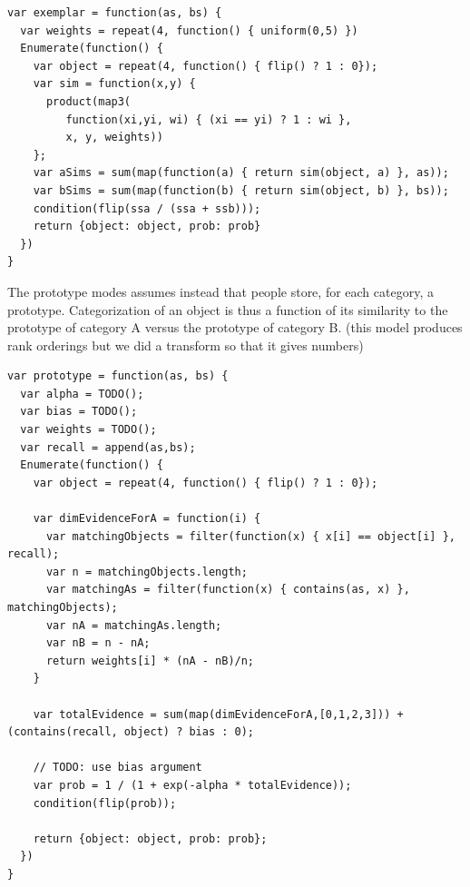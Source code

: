 \documentclass{article}
\newcommand{\cas}[1]{ \textsf{\color{darkgray} \scriptsize #1} }
\begin{document}


\begin{lstlisting}[caption=Exemplar model (TODO: clearer input/output types)]
var exemplar = function(as, bs) {
  var weights = repeat(4, function() { uniform(0,5) })
  Enumerate(function() {
    var object = repeat(4, function() { flip() ? 1 : 0});
    var sim = function(x,y) {
      product(map3(
         function(xi,yi, wi) { (xi == yi) ? 1 : wi },
         x, y, weights))
    };
    var aSims = sum(map(function(a) { return sim(object, a) }, as));
    var bSims = sum(map(function(b) { return sim(object, b) }, bs));
    condition(flip(ssa / (ssa + ssb)));
    return {object: object, prob: prob}
  })
}
\end{lstlisting}

The prototype modes assumes instead that people store, for each category, a prototype. Categorization of an object is thus a function of its similarity to the prototype of category A versus the prototype of category B.
\cas{(this model produces rank orderings but we did a transform so that it gives numbers)}

\begin{lstlisting}[caption=Prototype model]
var prototype = function(as, bs) {
  var alpha = TODO();
  var bias = TODO();
  var weights = TODO();
  var recall = append(as,bs);
  Enumerate(function() {
    var object = repeat(4, function() { flip() ? 1 : 0});

    var dimEvidenceForA = function(i) {
      var matchingObjects = filter(function(x) { x[i] == object[i] }, recall);
      var n = matchingObjects.length;
      var matchingAs = filter(function(x) { contains(as, x) }, matchingObjects);
      var nA = matchingAs.length;
      var nB = n - nA;
      return weights[i] * (nA - nB)/n;
    }

    var totalEvidence = sum(map(dimEvidenceForA,[0,1,2,3])) + (contains(recall, object) ? bias : 0);

    // TODO: use bias argument
    var prob = 1 / (1 + exp(-alpha * totalEvidence));
    condition(flip(prob));

    return {object: object, prob: prob};
  })
}
\end{lstlisting}
\end{document}
